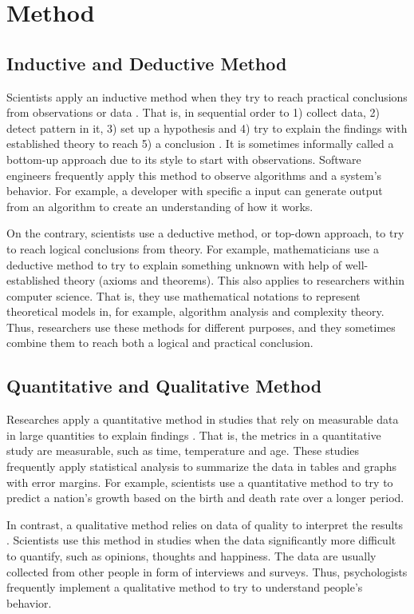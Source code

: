 \documentclass[a4paper,11pt]{kth-mag}
\newcommand*{\skippara}{\par\vspace{\baselineskip} \noindent}
\begin{document}
\chapter{Method}

\section{Inductive and Deductive Method}
Scientists apply an inductive method when they try to reach practical conclusions from observations or data \cite{Omexperi69:online}.
That is, in sequential order to 1) collect data, 2) detect pattern in it, 3) set up a hypothesis and 4) try to explain the findings with established theory to reach 5) a conclusion \cite{web:induction}.
It is sometimes informally called a bottom-up approach due to its style to start with observations.
Software engineers frequently apply this method to observe algorithms and a system's behavior.
For example, a developer with specific a input can generate output from an algorithm to create an understanding of how it works.

\skippara On the contrary, scientists use a deductive method, or top-down approach, to try to reach logical conclusions from theory.
For example, mathematicians use a deductive method to try to explain something unknown with help of well-established theory (axioms and theorems).
This also applies to researchers within computer science.
That is, they use mathematical notations to represent theoretical models in, for example, algorithm analysis and complexity theory.
Thus, researchers use these methods for different purposes, and they sometimes combine them to reach both a logical and practical conclusion.

\section{Quantitative and Qualitative Method}

Researches apply a quantitative method in studies that rely on measurable data in large quantities to explain findings \cite{haakansson2013portal}.
That is, the metrics in a quantitative study are measurable, such as time, temperature and age.
These studies frequently apply statistical analysis to summarize the data in tables and graphs with error margins.
For example, scientists use a quantitative method to try to predict a nation's growth based on the birth and death rate over a longer period.

\skippara In contrast, a qualitative method relies on data of quality to interpret the results \cite{merriam2009qualitative}.
Scientists use this method in studies when the data significantly more difficult to quantify, such as opinions, thoughts and happiness.
The data are usually collected from other people in form of interviews and surveys.
Thus, psychologists frequently implement a qualitative method to try to understand people's behavior.
\end{document}
